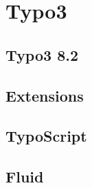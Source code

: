 \section{Typo3}\label{Typo3}
\subsection{Typo3 8.2}
\subsection{Extensions}
\subsection{TypoScript}
\subsection{Fluid}\label{Fluid}
